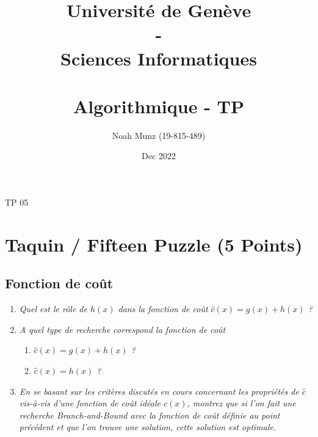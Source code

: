 \documentclass[french]{article}
\title{\vspace{-2cm}
   {\huge Université de Genève \\ - \\ Sciences Informatiques} \\
    \vspace{0.6cm}
    \unilogo{0.38} \\ 
    \vspace{1.1cm}
    {\huge Algorithmique - TP \nb}
    \vspace{0.1cm}
}
\author{Noah Munz (19-815-489)}
\date{Dec 2022}
\newcommand{\nb}{05}
\begin{document}
%
\maketitle
\vspace{0.5cm}
\tableofcontents
\thispagestyle{empty}
\clearpage
\setcounter{page}{1}
%
%
\begin{center}
	{\huge TP \nb}
\end{center}
\vspace{0.3cm}
%
\section{Taquin / Fifteen Puzzle (5 Points)}

\subsection{Fonction de coût}
\vspace{0.4cm}


\begin{enumerate}[label=(\alph*)]
	\item \textit{Quel est le rôle de $h(x)$ dans la fonction de coût $\hat{c}(x) = g(x) + h(x)$ ?}
	\item \textit{A quel type de recherche correspond la fonction de coût}
	\begin{enumerate}[label=\arabic*)]
		\item \textit{$\hat{c}(x) = g(x) + h(x)$ ?}
		\item \textit{$\hat{c}(x) = h(x)$ ?}
	\end{enumerate}
	\item  \textit{En se basant sur les critères discutés en cours concernant les propriétés de $\hat{c}$
	vis-à-vis d'une fonction de coût idéale $c(x)$, montrez que si l'on fait une recherche Branch-and-Bound 
	avec la fonction de coût définie au point précédent et que l'on trouve une solution, cette solution est optimale.}\\
\end{enumerate}
\end{document}
